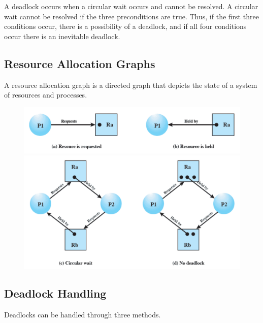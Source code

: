 A deadlock occurs when a circular wait occurs and cannot be resolved.
A circular wait cannot be resolved if the three preconditions are true.
Thus, if the first three conditions occur, there is a possibility of a deadlock, and if all four conditions occur there is an inevitable deadlock.

\subsection{Resource Allocation Graphs}

A resource allocation graph is a directed graph that depicts the state of a system of resources and processes.

\begin{figure}[htp]
  \centering
  \includegraphics[width=15cm]{unit-15/figures/resource-graph-1.png}
  \includegraphics[width=15cm]{unit-15/figures/resource-graph-2.png}
\end{figure}

\subsection{Deadlock Handling}

Deadlocks can be handled through three methods.


